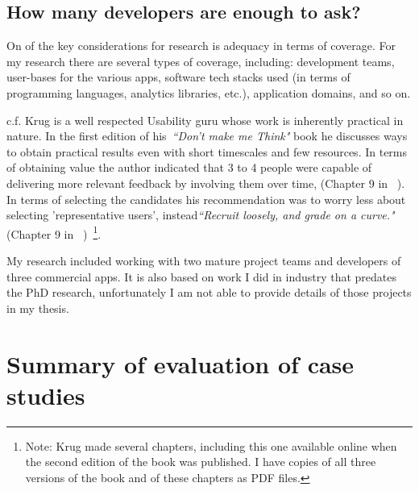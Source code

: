 \subsection{How many developers are enough to ask?}
On of the key considerations for research is adequacy in terms of coverage. For my research there are several types of coverage, including: development teams, user-bases for the various apps, software tech stacks used (in terms of programming languages, analytics libraries, etc.), application domains, and so on. 

c.f. Krug is a well respected Usability guru whose work is inherently practical in nature. In the first edition of his~\emph{``Don't make me Think"} book he discusses ways to obtain practical results even with short timescales and few resources. In terms of obtaining value the author indicated that 3 to 4 people were capable of delivering more relevant feedback by involving them over time, (Chapter 9 in ~\cite{krug2000dont_make_me_think}). In terms of selecting the candidates his recommendation was to worry less about selecting 'representative users', instead\emph{``Recruit loosely, and grade on a curve."} (Chapter 9 in ~\cite{krug2000dont_make_me_think})~\footnote{Note: Krug made several chapters, including this one available online when the second edition of the book was published. I have copies of all three versions of the book and of these chapters as PDF files.}.

My research included working with two mature project teams and developers of three commercial apps. It is also based on work I did in industry that predates the PhD research, unfortunately I am not able to provide details of those projects in my thesis. 

\section{Summary of evaluation of case studies}

